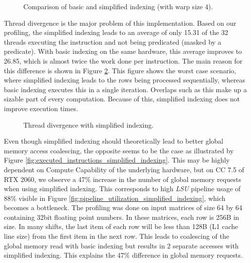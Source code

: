 \begin{figure}[ht]
	\centering
	\def\svgwidth{0.4\textwidth}
	
	\caption{Comparison of basic and simplified indexing (with warp size 4).}
	\label{fig:warp_per_shift_simplified_indexing}
\end{figure}

Thread divergence is the major problem of this implementation. Based on our profiling, the simplified indexing leads to an average of only 15.31 of the 32 threads executing the instruction and not being predicated (masked by a predicate). With basic indexing on the same hardware, this average improves to 26.85, which is almost twice the work done per instruction. The main reason for this difference is shown in Figure \ref{fig:warp_per_shift_thread_divergence}. This figure shows the worst case scenario, where simplified indexing leads to the rows being processed sequentially, whereas basic indexing executes this in a single iteration. Overlaps such as this make up a sizable part of every computation. Because of this, simplified indexing does not improve execution times.


\begin{figure}[ht]
	\centering
	\def\svgwidth{0.3\textwidth}
	
	\caption{Thread divergence with simplified indexing.}
	\label{fig:warp_per_shift_thread_divergence}
\end{figure}

Even though simplified indexing should theoretically lead to better global memory access coalescing, the opposite seems to be the case as illustrated by Figure \ref{fig:executed_instructions_simplified_indexing}. This may be highly dependent on Compute Capability of the underlying hardware, but on CC 7.5 of RTX 2060, we observe a 47\% increase in the number of global memory requests when using simplified indexing. This corresponds to high \textit{LSU} pipeline usage of 88\% visible in Figure \ref{fig:pipeline_utilization_simplified_indexing}, which becomes a bottleneck. The profiling was done on input matrices of size 64 by 64 containing 32bit floating point numbers. In these matrices, each row is 256B in size. In many shifts, the last item of each row will be less than 128B (L1 cache line size) from the first item in the next row. This leads to coalescing of the global memory read with basic indexing but results in 2 separate accesses with simplified indexing. This explains the 47\% difference in global memory requests.

